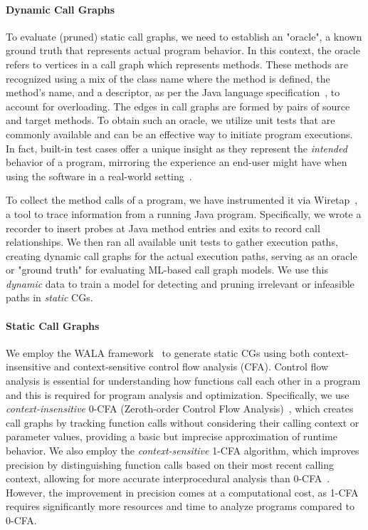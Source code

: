 \paragraph{Dynamic Call Graphs} 
To evaluate (pruned) static call graphs, we need to establish an "oracle", a known ground truth that represents actual program behavior. In this context, the oracle refers to vertices in a call graph which represents methods. These methods are recognized using a mix of the class name where the method is defined, the method's name, and a descriptor, as per the Java language specification~\cite{lindholm2021java}, to account for overloading. The edges in call graphs are formed by pairs of source and target methods.
To obtain such an oracle, we utilize unit tests that are commonly available and can be an effective way to initiate program executions. In fact, built-in test cases offer a unique insight as they represent the \textit{intended} behavior of a program, mirroring the experience an end-user might have when using the software in a real-world setting~\cite{sui2020recall}.

To collect the method calls of a program, we have instrumented it via Wiretap~\cite{kalhauge2018sound}, a tool to trace information from a running Java program. Specifically, we wrote a recorder to insert probes at Java method entries and exits to record call relationships.
We then ran all available unit tests to gather execution paths, creating dynamic call graphs for the actual execution paths, serving as an oracle or "ground truth" for evaluating ML-based call graph models.
We use this \emph{dynamic} data to train a model for detecting and pruning irrelevant or infeasible paths in \emph{static} CGs.

\paragraph{Static Call Graphs}
We employ the WALA framework~\cite{fink2012wala} to generate static CGs using both context-insensitive and context-sensitive control flow analysis (CFA). Control flow analysis is essential for understanding how functions call each other in a program and this is required for program analysis and optimization. Specifically, we use \emph{context-insensitive} 0-CFA (Zeroth-order Control Flow Analysis)~\cite{shivers1991control}, which creates call graphs by tracking function calls without considering their calling context or parameter values, providing a basic but imprecise approximation of runtime behavior. We also employ the \emph{context-sensitive} 1-CFA algorithm, which improves precision by distinguishing function calls based on their most recent calling context, allowing for more accurate interprocedural analysis than 0-CFA~\cite{shivers1991control}. However, the improvement in precision comes at a computational cost, as 1-CFA requires significantly more resources and time to analyze programs compared to 0-CFA.

